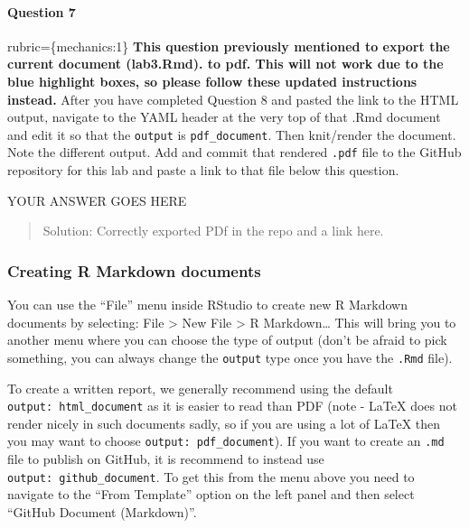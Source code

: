 \documentclass[
]{article}
\begin{document}
\begin{alert alert-info}
\hypertarget{question-7}{%
\paragraph{Question 7}\label{question-7}}

rubric=\{mechanics:1\} \textbf{This question previously mentioned to
export the current document (lab3.Rmd). to pdf. This will not work due
to the blue highlight boxes, so please follow these updated instructions
instead.} After you have completed Question 8 and pasted the link to the
HTML output, navigate to the YAML header at the very top of that .Rmd
document and edit it so that the \texttt{output} is
\texttt{pdf\_document}. Then knit/render the document. Note the
different output. Add and commit that rendered \texttt{.pdf} file to the
GitHub repository for this lab and paste a link to that file below this
question.
\end{alert alert-info}

YOUR ANSWER GOES HERE

\begin{quote}
Solution: Correctly exported PDf in the repo and a link here.
\end{quote}

\hypertarget{creating-r-markdown-documents}{%
\subsubsection{Creating R Markdown
documents}\label{creating-r-markdown-documents}}

You can use the ``File'' menu inside RStudio to create new R Markdown
documents by selecting: File \textgreater{} New File \textgreater{} R
Markdown\ldots{} This will bring you to another menu where you can
choose the type of output (don't be afraid to pick something, you can
always change the \texttt{output} type once you have the \texttt{.Rmd}
file).

To create a written report, we generally recommend using the default
\texttt{output:\ html\_document} as it is easier to read than PDF (note
- LaTeX does not render nicely in such documents sadly, so if you are
using a lot of LaTeX then you may want to choose
\texttt{output:\ pdf\_document}). If you want to create an \texttt{.md}
file to publish on GitHub, it is recommend to instead use
\texttt{output:\ github\_document}. To get this from the menu above you
need to navigate to the ``From Template'' option on the left panel and
then select ``GitHub Document (Markdown)''.
\end{document}
